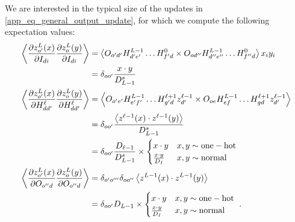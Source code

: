 We are interested in the typical size of the updates in \eqref{app_eq_general_output_update}, for which
we compute the following expectation values:
\begin{align}
\left  \langle \frac{ \partial z ^{ L }_{ o' }(x) }{ \partial I_{ di } }\frac{ \partial z^{ L }_{ o }(y) }{ \partial I_{ di } }  \right \rangle &=\left  \langle O_{ o'd' }H^{ L-1 }_{d'e' } \ldots  H^{ 0 }_{  f'd }\times  O_{ od'' }H^{ L-1 }_{d''e'' } \ldots  H^{ 0 }_{  f''d }\right  \rangle x_{ i } y_{ i }\nonumber\\
  &= \delta_{ oo' }\frac{ x \cdot y }{ D^{ s }_{ L-1 } } \nonumber\\
\left  \langle \frac{ \partial z ^{ L }_{ o' }(x) }{ \partial H^{ \ell }_{ dd' } }\frac{ \partial z^{ L }_{ o }(y) }{ \partial H^{ \ell }_{ dd' } }  \right \rangle &= \left \langle O_{ o'e' }H^{ L-1 }_{e'f' } \ldots  H^{ \ell+1 }_{  g'd } z^{ \ell-1 }_{ d' }\times O_{ oe }H^{ L-1 }_{ef } \ldots  H^{ \ell+1 }_{  gd } z^{ \ell-1 }_{ d' } \right  \rangle \nonumber\\
  &= \delta_{ oo' } \frac{ \left\langle z^{ \ell-1 }(x)\cdot z^{ \ell-1 }(y) \right\rangle }{ D^{ s }_{ L-1 } }\nonumber\\
  &= \delta_{ oo' }  \frac{D_{ \ell-1 }}{ D^{ s }_{ L-1 } }\times \begin{cases} x\cdot y & x, y \sim {\rm one-hot}\\ \frac{ x\cdot y }{ D_{ I } } & x, y \sim {\rm normal}\end{cases}\nonumber\\
\left  \langle \frac{ \partial z ^{ L }_{ o' }(x) }{ \partial O_{ o''d } }\frac{ \partial z^{ L }_{ o }(y) }{ \partial O_{ o''d } }  \right \rangle &= \delta_{ o'o''' }\delta_{ oo'' } \left \langle z^{ L-1 }(x)\cdot z^{ L-1 }(y) \right  \rangle \nonumber\\
&= \delta_{ oo' } D_{ L-1 }\times \begin{cases} x\cdot y & x, y \sim {\rm one-hot}\\ \frac{ x\cdot y }{ D_{ I } } & x, y \sim {\rm normal}\end{cases}\ . \label{app_eq_mup_expectation_vals}
\end{align}

